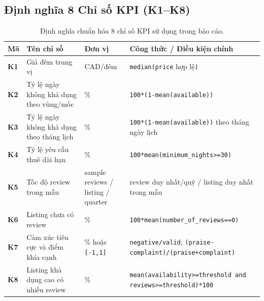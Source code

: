 \documentclass[11pt,a4paper]{article}
\begin{document}
\subsection{Định nghĩa 8 Chỉ số KPI (K1--K8)}

\begin{table}[H]
  \centering
  \footnotesize
  \renewcommand{\arraystretch}{1.22}
  \begin{tabularx}{\textwidth}{l >{\raggedright\arraybackslash}p{4.3cm} >{\raggedright\arraybackslash}p{2.3cm} >{\raggedright\arraybackslash}X}
    \toprule
    \rowcolor{NavyDark}
    \color{white}\textbf{Mã} &
    \color{white}\textbf{Tên chỉ số} &
    \color{white}\textbf{Đơn vị} &
    \color{white}\textbf{Công thức / Điều kiện chính} \\
    \midrule
    \textbf{K1} & Giá đêm trung vị & CAD/đêm & \texttt{median(price} hợp lệ\texttt{)} \\
    \rowcolor{LightBg}
    \textbf{K2} & Tỷ lệ ngày không khả dụng theo vùng/mốc & \% & \texttt{100*(1-mean(available))} \\
    \textbf{K3} & Tỷ lệ ngày không khả dụng theo tháng lịch & \% & \texttt{100*(1-mean(available))} theo tháng ngày lịch \\
    \rowcolor{LightBg}
    \textbf{K4} & Tỷ lệ yêu cầu thuê dài hạn & \% & \texttt{100*mean(minimum\_nights>=30)} \\
    \textbf{K5} & Tốc độ review trong mẫu & sample reviews / listing / quarter & review duy nhất/quý / listing duy nhất trong mẫu \\
    \rowcolor{LightBg}
    \textbf{K6} & Listing chưa có review & \% & \texttt{100*mean(number\_of\_reviews==0)} \\
    \textbf{K7} & Cảm xúc tiêu cực và điểm khía cạnh & \% hoặc \texttt{[-1,1]} & \texttt{negative/valid}; \texttt{(praise-complaint)/(praise+complaint)} \\
    \rowcolor{LightBg}
    \textbf{K8} & Listing khả dụng cao có nhiều review & \% & \texttt{mean(availability>=threshold and reviews>=threshold)*100} \\
    \bottomrule
  \end{tabularx}
  \caption{\small Định nghĩa chuẩn hóa 8 chỉ số KPI sử dụng trong báo cáo.}
\end{table}
\end{document}
